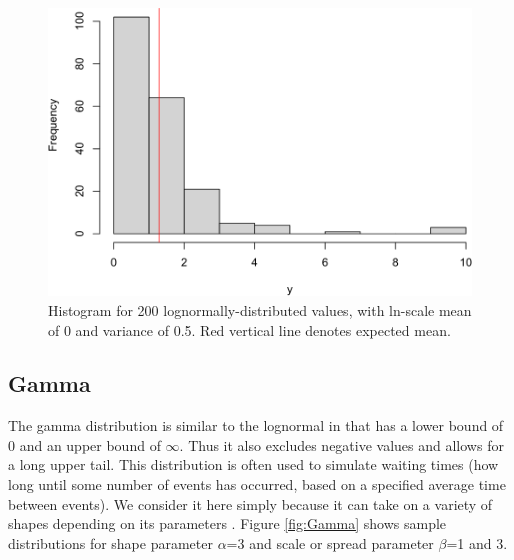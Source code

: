 \documentclass[
]{krantz}
\begin{document}
\begin{figure}
\includegraphics[width=0.9\linewidth]{bookdown_files/figure-latex/Lognormal-1} \caption{Histogram for 200 lognormally-distributed values, with ln-scale mean of 0 and variance of 0.5. Red vertical line denotes expected mean.}\label{fig:Lognormal}
\end{figure}

\hypertarget{gamma}{%
\subsection{Gamma}\label{gamma}}

The gamma distribution is similar to the lognormal in that has a lower bound of 0 and an upper bound of \(\infty\). Thus it also excludes negative values and allows for a long upper tail. This distribution is often used to simulate waiting times (how long until some number of events has occurred, based on a specified average time between events). We consider it here simply because it can take on a variety of shapes depending on its parameters \citep{bolker2008}. Figure \ref{fig:Gamma} shows sample distributions for shape parameter \(\alpha\)=3 and scale or spread parameter \(\beta\)=1 and 3.
\end{document}
